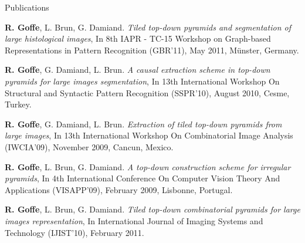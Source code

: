 \begin{rubric}{Publications}
  

  \textbf{R. Goffe}, L. Brun, G. Damiand.
  \textit{Tiled top-down pyramids and segmentation of large histological images}, 
  In 8th IAPR - TC-15 Workshop on Graph-based Representations in Pattern Recognition (GBR'11),
  May 2011, Münster, Germany.

  \textbf{R. Goffe}, G. Damiand, L. Brun.
  \textit{A causal extraction scheme in top-down pyramids for large images segmentation}, 
  In 13th International Workshop On Structural and Syntactic Pattern Recognition (SSPR'10), 
  August 2010, Cesme, Turkey.

  \textbf{R. Goffe}, G. Damiand, L. Brun.
  \textit{Extraction of tiled top-down pyramids from large images}, 
  In 13th International Workshop On Combinatorial Image Analysis (IWCIA'09), 
  November 2009, Cancun, Mexico.

  \textbf{R. Goffe}, L. Brun, G. Damiand.
  \textit{A top-down construction scheme for irregular pyramids}, 
  In 4th International Conference On Computer Vision Theory And Applications (VISAPP'09), 
  February 2009, Lisbonne, Portugal.
  

  \textbf{R. Goffe}, L. Brun, G. Damiand.
  \textit{Tiled top-down combinatorial pyramids for large images representation}, 
  In International Journal of Imaging Systems and Technology (IJIST'10), 
  February 2011.

\end{rubric}
